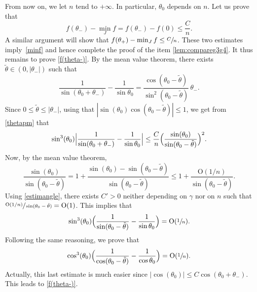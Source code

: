 \documentclass[JEP,XML,SOM,Unicode, NoEqCountersInSection,NoFloatCountersInSection,published]{cedram}
\theoremstyle{definition}
\begin{document}
From now on, we let $n$ tend to $+\infty$. In particular, $\theta_0$ depends on $n$.
Let us prove that
\begin{equation} \label{f(theta-)}
f(\theta_-)-\min_J f =f(\theta_-) - f(0) \leq \frac{C}{n}.
\end{equation}
A similar argument will show that $f(\theta_+)-\min_J f \leq \sfrac{C}{n}$.
These two estimates imply~\eqref{minf} and hence complete the proof of the item \ref{lem:compareg3g4}.
It thus remains to prove
\eqref{f(theta-)}.
By the mean value theorem, there exists $\tilde \theta \in (0,|\theta_-|)$ such that
\[\frac{1}{\sin (\theta_0 + \theta_-)} - \frac{1}{\sin \theta_0}=\frac{\cos (\theta_0-\tilde \theta)}{\sin^2(\theta_0-\tilde \theta)}\, \theta_-.
\]
Since $0 \leq \tilde \theta \leq |\theta_-|$, using that $|\sin(\theta_0) \cos(\theta_0 - \tilde \theta)| \leq 1$, we get from \eqref{thetapm} that
\[\sin^3(\theta_0) \Bigl| \frac{1}{\sin (\theta_0+\theta_-)} - \frac{1}{\sin \theta_0} \Bigr| \leq \frac{C}{n} \Bigl( \frac{\sin(\theta_0)}{\sin(\theta_0 - \tilde \theta)} \Bigr)^2.\]
Now, by the mean value theorem,
\[\frac{\sin(\theta_0)}{\sin(\theta_0 -\tilde \theta)} = 1 + \frac{\sin(\theta_0) - \sin(\theta_0 -\tilde \theta) }{\sin(\theta_0 -\tilde \theta)} \leq 1 + \frac{\mathrm{O}(1/n)}{\sin(\theta_0 - \tilde \theta)}.\]
Using \eqref{estimangle}, there exists $C'>0$ neither depending on $\gamma$ nor on $n$ such that $\sfrac{\mathrm{O}(1/n)}{\sin(\theta_0 -\tilde \theta)} =\mathrm{O}(1)$. This implies that
\[\sin^3(\theta_0) \Bigl( \frac{1}{\sin (\theta_0 -\tilde \theta)} - \frac{1}{\sin \theta_0} \Bigr) =\mathrm{O}(\sfrac{1}{n}).\]
Following the same reasoning, we prove that
\[
\cos^3(\theta_0) \Bigl( \frac{1}{\cos (\theta_0 - \tilde \theta)} - \frac{1}{\cos \theta_0} \Bigr) = \mathrm{O}(\sfrac{1}{n}).
\]
Actually, this last estimate is much easier since $|\cos(\theta_0)| \leq C \cos(\theta_0 + \theta_-)$. This leads to \eqref{f(theta-)}.
\end{document}
